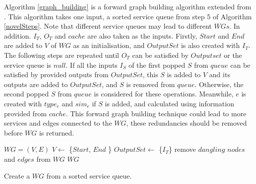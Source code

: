 Algorithm  \ref{graph_building} is a forward graph building algorithm extended from \cite{blum1997fast}. This algorithm takes one input, a sorted service queue from step 5 of Algorithm \ref{novelSteps}. Note that different service queues may lead to different $WGs$. In addition. $I_{T}$, $O_{T}$ and $cache$ are also taken as the inputs. Firstly, $Start$ and $End$ are added to $V$ of $WG$ as an initialisation, and $OutputSet$ is also created with $I_{T}$. The following steps are repeated until $O_{T}$ can be satisfied by $Outputset$ or the service queue is $null$. If all the inputs $I_{S}$ of the first popped  $S$ from $queue$ can be satisfied by provided outputs from $OutputSet$, this $S$ is added to $V$ and its outputs are added to $OutputSet$, and $S$ is removed from $queue$. Otherwise, the second popped  $S$ from $queue$ is considered for these operations. Meanwhile, $e$ is created with $type_e$ and $sim_e$ if $S$ is added, and calculated using information provided from $cache$. This forward graph building technique could lead to more services and edges connected to the $WG$, these redundancies should be removed before $WG$ is returned.

\begin{algorithm}
 \SetNlSty{}{}{:}
 $WG = (V, E)$\;
 $V \leftarrow$ \{$Start$, $End$ \} \;
 $OutputSet \leftarrow$ \{$I_{T}$\}\;
 remove $dangling$ $nodes$ and $edges$ from $WG$\; 
 \KwRet $WG$\;
 \caption{Create a $WG$ from a sorted service queue.}
\label{graph_building}
\end{algorithm} 


